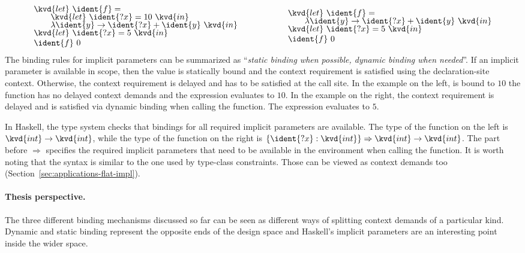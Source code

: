 \begin{equation*}
\begin{array}{l}
\kvd{let}~\ident{f}=\\[-0.25em]
\qquad\kvd{let}~\ident{?x}=10~\kvd{in}\\[-0.25em]
\qquad\lambda \ident{y}\rightarrow \ident{?x}+\ident{y}~\kvd{in}\\[-0.25em]
\kvd{let}~\ident{?x}=5~\kvd{in}\\
\ident{f}~0
\end{array}\hspace{5em}\begin{array}{l}
\kvd{let}~\ident{f}=\\[-0.25em]
\qquad\lambda \ident{y}\rightarrow \ident{?x}+\ident{y}~\kvd{in}\\[-0.25em]
\kvd{let}~\ident{?x}=5~\kvd{in}\\
\ident{f}~0
\end{array}
\end{equation*}
%
The binding rules for implicit parameters can be summarized as ``\emph{static binding when possible,
dynamic binding when needed}''. If an implicit parameter is available in scope, then the value
is statically bound and the context requirement is satisfied using the declaration-site context.
Otherwise, the context requirement is delayed and has to be satisfied at the call site.
In the example on the left,  is bound to $10$ the function  has no
delayed context demands and the expression evaluates to $10$. In the example on the right,
the context requirement  is delayed and is satisfied via dynamic binding when calling
the function. The expression evaluates to $5$.

In Haskell, the type system checks that bindings for all required implicit parameters are
available. The type of the function  on the left is $\kvd{int}\rightarrow\kvd{int}$, while
the type of the  function on the right is $\{\ident{?x}:\kvd{int}\}\Rightarrow\kvd{int}\rightarrow\kvd{int}$.
The part before $\Rightarrow$ specifies the required implicit parameters that need to be available
in the environment when calling the function. It is worth noting that the syntax is similar to the
one used by type-class constraints. Those can be viewed as context demands too
(Section~\ref{sec:applications-flat-impl}).

\paragraph{Thesis perspective.}
The three different binding mechanisms discussed so far can be seen as different ways of splitting
context demands of a particular kind. Dynamic and static binding represent the opposite ends
of the design space and Haskell's implicit parameters are an interesting point inside the wider space.

